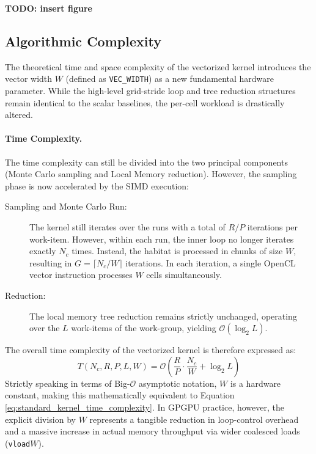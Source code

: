 \textbf{TODO: insert figure}


\subsection{Algorithmic Complexity}\label{subsec:algorithmic_complexity_vectorized}
The theoretical time and space complexity of the vectorized kernel introduces the vector width $W$ (defined as \texttt{VEC\_WIDTH}) as a new fundamental hardware parameter. While the high-level grid-stride loop and tree reduction structures remain identical to the scalar baselines, the per-cell workload is drastically altered.

\paragraph{Time Complexity.}
The time complexity can still be divided into the two principal components (Monte Carlo sampling and Local Memory reduction). However, the sampling phase is now accelerated by the SIMD execution:
\begin{description}
    \item[Sampling and Monte Carlo Run:] The kernel still iterates over the runs with a total of $R/P$ iterations per work-item. However, within each run, the inner loop no longer iterates exactly $N_c$ times. Instead, the habitat is processed in chunks of size $W$, resulting in $G = \lceil N_c / W \rceil$ iterations. In each iteration, a single OpenCL vector instruction processes $W$ cells simultaneously.
    \item[Reduction:] The local memory tree reduction remains strictly unchanged, operating over the $L$ work-items of the work-group, yielding $\mathcal{O}(\log_2 L)$.
\end{description}

\noindent
The overall time complexity of the vectorized kernel is therefore expressed as:
\begin{equation}
    T(N_c, R, P, L, W) = \mathcal{O}\left(\frac{R}{P} \cdot \frac{N_c}{W} + \log_2 L\right)
\label{eq:vectorized_kernel_time_complexity}
\end{equation}
Strictly speaking in terms of Big-$\mathcal{O}$ asymptotic notation, $W$ is a hardware constant, making this mathematically equivalent to Equation \ref{eq:standard_kernel_time_complexity}. In GPGPU practice, however, the explicit division by $W$ represents a tangible reduction in loop-control overhead and a massive increase in actual memory throughput via wider coalesced loads (\texttt{vload$W$}).

